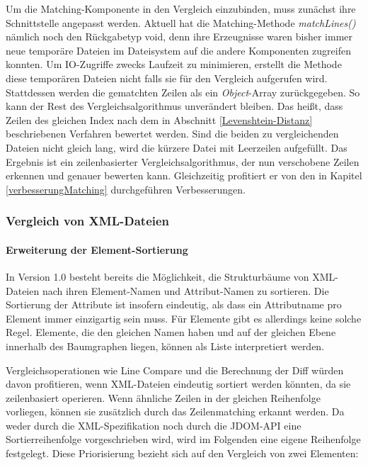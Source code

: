 Um die Matching-Komponente in den Vergleich einzubinden, muss zunächst ihre Schnittstelle angepasst werden. Aktuell hat die Matching-Methode \textit{matchLines()} nämlich noch den Rückgabetyp void, denn ihre Erzeugnisse waren bisher immer neue temporäre Dateien im Dateisystem auf die andere Komponenten zugreifen konnten. Um IO-Zugriffe zwecks Laufzeit zu minimieren, erstellt die Methode diese temporären Dateien nicht falls sie für den Vergleich aufgerufen wird. Stattdessen werden die gematchten Zeilen als ein \textit{Object}-Array zurückgegeben. So kann der Rest des Vergleichsalgorithmus unverändert bleiben. Das heißt, dass Zeilen des gleichen Index nach dem in Abschnitt \ref{Levenshtein-Distanz} beschriebenen Verfahren bewertet werden. Sind die beiden zu vergleichenden Dateien nicht gleich lang, wird die kürzere Datei mit Leerzeilen aufgefüllt. Das Ergebnis ist ein zeilenbasierter Vergleichsalgorithmus, der nun verschobene Zeilen erkennen und genauer bewerten kann. Gleichzeitig profitiert er von den in Kapitel \ref{verbesserungMatching} durchgeführen Verbesserungen.

\subsubsection{Vergleich von XML-Dateien}\label{xmlChapter}

\paragraph{Erweiterung der Element-Sortierung}\mbox{}\label{xmlSortierung}

In Version 1.0 besteht bereits die Möglichkeit, die Strukturbäume von XML-Dateien nach ihren Element-Namen und Attribut-Namen zu sortieren. Die Sortierung der Attribute ist insofern eindeutig, als dass ein Attributname pro Element immer einzigartig sein muss. Für Elemente gibt es allerdings keine solche Regel. Elemente, die den gleichen Namen haben und auf der gleichen Ebene innerhalb des Baumgraphen liegen, können als Liste interpretiert werden. 

Vergleichsoperationen wie Line Compare und die Berechnung der Diff würden davon profitieren, wenn XML-Dateien eindeutig sortiert werden könnten, da sie zeilenbasiert operieren. Wenn ähnliche Zeilen in der gleichen Reihenfolge vorliegen, können sie zusätzlich durch das Zeilenmatching erkannt werden. Da weder durch die XML-Spezifikation noch durch die JDOM-API eine Sortierreihenfolge vorgeschrieben wird, wird im Folgenden eine eigene Reihenfolge festgelegt. Diese Priorisierung bezieht sich auf den Vergleich von zwei Elementen:

